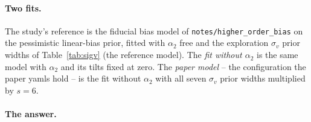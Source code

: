 \documentclass[11pt]{article}
\newcommand{\sv}{\sigma_v}
\newcommand{\us}{\_\allowbreak}
\begin{document}
\paragraph{Two fits.}
The study's reference is the fiducial bias model of
\texttt{notes/higher\us order\us bias} on the pessimistic
linear-bias prior, fitted with $\alpha_2$ free and the exploration
$\sv$ prior widths of Table~\ref{tab:sigv} (the reference model).  The
\emph{fit without $\alpha_2$} is the same model with $\alpha_2$ and
its tilts fixed at zero.  The \emph{paper model} -- the configuration
the paper yamls hold -- is the fit without $\alpha_2$ with all seven
$\sv$ prior widths multiplied by $s = 6$.

\paragraph{The answer.}
\end{document}
